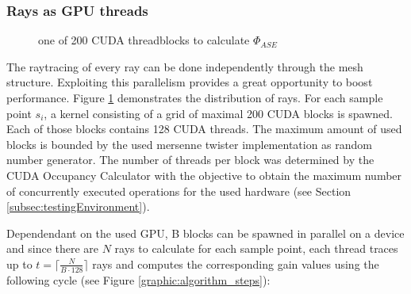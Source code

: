 \subsubsection{Rays as GPU threads}
\label{subsubsec:rays}
\begin{figure}[H]
  \centerline
  {}
  \caption{one of 200 CUDA threadblocks to calculate $\Phi_{ASE}$}
  \label{graphic:kernel}
\end{figure}
    The raytracing of every ray can be done independently through the mesh
    structure.  Exploiting this parallelism provides a great opportunity to
    boost performance. Figure \ref{graphic:kernel} demonstrates the distribution
    of rays. For each sample point $s_i$, a kernel consisting of a grid of 
    maximal 200 CUDA blocks is spawned. Each of those blocks contains 128 CUDA threads.
    The maximum amount of used blocks is bounded by the used
    mersenne twister implementation \cite{mersenne_twister} as random number generator.
    The number of threads per block was determined by the CUDA Occupancy 
    Calculator \cite{occupancy_calculator} with the objective to obtain the
    maximum number of concurrently executed operations for the used hardware
    (see Section \ref{subsec:testingEnvironment}).
    
    Dependendant on the used GPU, B blocks can be spawned
    in parallel on a device and since there are $N$ rays to calculate for each sample point, each thread
    traces up to $t = \lceil\frac {N}{B\cdot128}\rceil$ rays and computes the
    corresponding gain values using the following cycle (see Figure
    \ref{graphic:algorithm_steps}):
    
